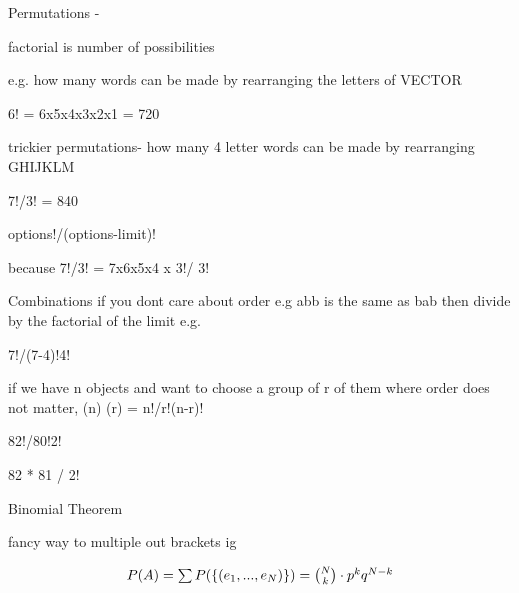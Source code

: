 \documentclass[12pt]{article}
\begin{document}
Permutations - 

factorial is number of possibilities

e.g.
how many words can be made by rearranging the letters of VECTOR

6! = 6x5x4x3x2x1 = 720

trickier permutations-
how many 4 letter words can be made by rearranging GHIJKLM

7!/3! = 840

options!/(options-limit)!

because 7!/3! = 7x6x5x4 x 3!/ 3!

Combinations
if you dont care about order e.g abb is the same as bab then divide by the factorial of the limit 
e.g.

7!/(7-4)!4!

if we have n objects and want to choose a group of r of them where order does not matter,
(n)
(r)     = n!/r!(n-r)!


82!/80!2!

82 * 81 / 2!


Binomial Theorem

fancy way to multiple out brackets ig

\begin{equation}
$$ P(A) = \sum P(\{ (e_1,...,e_N) \})  =  {{N}\choose{k}} \cdot p^kq^{N-k}$$
\end{equation}
\end{document}
